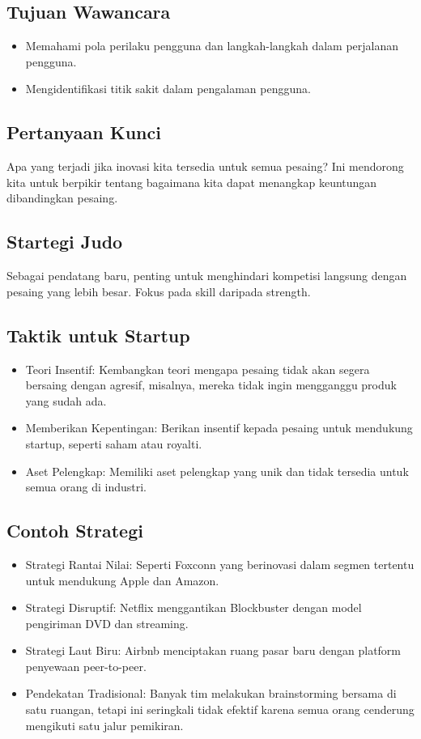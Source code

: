 \documentclass{article}
\begin{document}
\subsection{Tujuan Wawancara}
\begin{itemize}
    \item Memahami pola perilaku pengguna dan langkah-langkah dalam perjalanan pengguna.
    \item Mengidentifikasi titik sakit dalam pengalaman pengguna.
\end{itemize}

\subsection{Pertanyaan Kunci}
Apa yang terjadi jika inovasi kita tersedia untuk semua pesaing? Ini mendorong kita untuk berpikir tentang bagaimana kita dapat menangkap keuntungan dibandingkan pesaing.

\subsection{Startegi Judo}
Sebagai pendatang baru, penting untuk menghindari kompetisi langsung dengan pesaing yang lebih besar. Fokus pada skill daripada strength.

\subsection{Taktik untuk Startup}
\begin{itemize}
    \item Teori Insentif: Kembangkan teori mengapa pesaing tidak akan segera bersaing dengan agresif, misalnya, mereka tidak ingin mengganggu produk yang sudah ada.
    \item Memberikan Kepentingan: Berikan insentif kepada pesaing untuk mendukung startup, seperti saham atau royalti.
    \item Aset Pelengkap: Memiliki aset pelengkap yang unik dan tidak tersedia untuk semua orang di industri.
\end{itemize}

\subsection{Contoh Strategi}
\begin{itemize}
    \item Strategi Rantai Nilai: Seperti Foxconn yang berinovasi dalam segmen tertentu untuk mendukung Apple dan Amazon.
    \item Strategi Disruptif: Netflix menggantikan Blockbuster dengan model pengiriman DVD dan streaming.
    \item Strategi Laut Biru: Airbnb menciptakan ruang pasar baru dengan platform penyewaan peer-to-peer.
    \item Pendekatan Tradisional: Banyak tim melakukan brainstorming bersama di satu ruangan, tetapi ini seringkali tidak efektif karena semua orang cenderung mengikuti satu jalur pemikiran.
\end{itemize}
\end{document}
